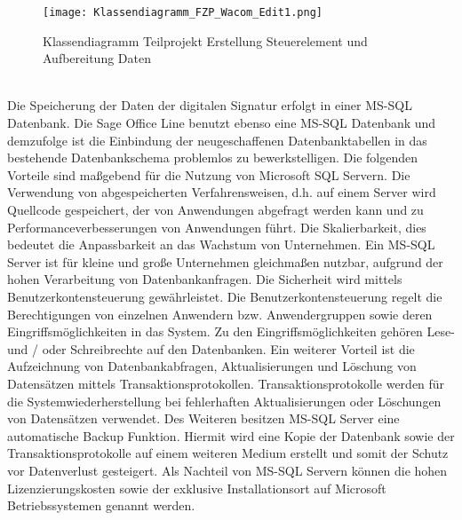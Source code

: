 \begin{figure}[!ht]
    \centering
    \texttt{[image: Klassendiagramm\_FZP\_Wacom\_Edit1.png]}
    \caption[Klassendiagramm Erstellung Steuerelement und Aufbereitung Daten]{\small{Klassendiagramm Teilprojekt Erstellung Steuerelement und Aufbereitung Daten}}
\end{figure}\\
Die Speicherung der Daten der digitalen Signatur erfolgt in einer MS-SQL Datenbank. Die Sage Office Line benutzt ebenso eine MS-SQL Datenbank und demzufolge ist die Einbindung der neugeschaffenen Datenbanktabellen in das bestehende Datenbankschema problemlos zu bewerkstelligen. Die folgenden Vorteile sind maßgebend für die Nutzung von Microsoft SQL Servern. Die Verwendung von abgespeicherten Verfahrensweisen, d.h. auf einem Server wird Quellcode  gespeichert, der von Anwendungen abgefragt werden kann und zu Performanceverbesserungen von Anwendungen führt. Die Skalierbarkeit, dies bedeutet die Anpassbarkeit an das Wachstum von Unternehmen. Ein MS-SQL Server ist für kleine und große Unternehmen gleichmaßen nutzbar, aufgrund der hohen Verarbeitung von Datenbankanfragen. Die Sicherheit wird mittels Benutzerkontensteuerung gewährleistet. Die Benutzerkontensteuerung regelt die Berechtigungen von einzelnen Anwendern bzw. Anwendergruppen sowie deren Eingriffsmöglichkeiten in das System. Zu den Eingriffsmöglichkeiten gehören Lese- und / oder Schreibrechte auf den Datenbanken. Ein weiterer Vorteil ist die Aufzeichnung von Datenbankabfragen, Aktualisierungen und Löschung von Datensätzen mittels Transaktionsprotokollen. Transaktionsprotokolle werden für die Systemwiederherstellung bei fehlerhaften Aktualisierungen oder Löschungen von Datensätzen verwendet. Des Weiteren besitzen MS-SQL Server eine automatische Backup Funktion. Hiermit wird eine Kopie der Datenbank sowie der Transaktionsprotokolle auf einem weiteren Medium erstellt und somit der Schutz vor Datenverlust gesteigert. Als Nachteil von MS-SQL Servern können die hohen Lizenzierungskosten sowie der exklusive Installationsort auf Microsoft Betriebssystemen genannt werden. \cite{SQLv1}